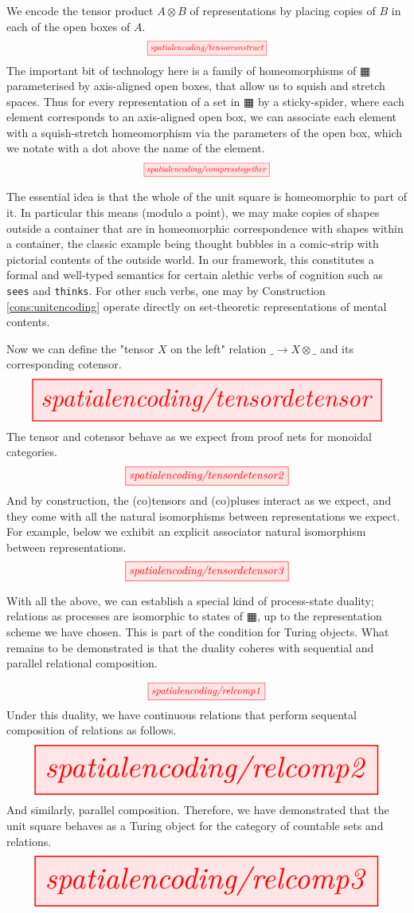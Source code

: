 We encode the tensor product $A \otimes B$ of representations by placing copies of $B$ in each of the open boxes of $A$.
\[\scalebox{0.75}{\tikzfig{spatialencoding/tensorconstruct}}\]
The important bit of technology here is a family of homeomorphisms of $\squarehvfill$ parameterised by axis-aligned open boxes, that allow us to squish and stretch spaces. Thus for every representation of a set in $\squarehvfill$ by a sticky-spider, where each element corresponds to an axis-aligned open box, we can associate each element with a squish-stretch homeomorphism via the parameters of the open box, which we notate with a dot above the name of the element.
\[\scalebox{0.75}{\tikzfig{spatialencoding/compresstogether}}\]
\begin{remark}
The essential idea is that the whole of the unit square is homeomorphic to part of it. In particular this means (modulo a point), we may make copies of shapes outside a container that are in homeomorphic correspondence with shapes within a container, the classic example being thought bubbles in a comic-strip with pictorial contents of the outside world. In our framework, this constitutes a formal and well-typed semantics for certain alethic verbs of cognition such as \texttt{sees} and \texttt{thinks}. For other such verbs, one may by Construction \ref{cons:unitencoding} operate directly on set-theoretic representations of mental contents.
\end{remark}

Now we can define the "tensor $X$ on the left" relation $\_ \rightarrow X \otimes \_$ and its corresponding cotensor.
\[\resizebox{\textwidth}{!}{\tikzfig{spatialencoding/tensordetensor}}\]
The tensor and cotensor behave as we expect from proof nets for monoidal categories.
\[\scalebox{1}{\tikzfig{spatialencoding/tensordetensor2}}\]
And by construction, the (co)tensors and (co)pluses interact as we expect, and they come with all the natural isomorphisms between representations we expect. For example, below we exhibit an explicit associator natural isomorphism between representations.
\[\scalebox{1}{\tikzfig{spatialencoding/tensordetensor3}}\]

\begin{construction}\label{cons:unitencoding}
With all the above, we can establish a special kind of process-state duality; relations as processes are isomorphic to states of $\squarehvfill$, up to the representation scheme we have chosen. This is part of the condition for Turing objects. What remains to be demonstrated is that the duality coheres with sequential and parallel relational composition.
\end{construction}
\[\scalebox{0.9}{\tikzfig{spatialencoding/relcomp1}}\]
Under this duality, we have continuous relations that perform sequental composition of relations as follows.
\[\resizebox{\textwidth}{!}{\tikzfig{spatialencoding/relcomp2}}\]
And similarly, parallel composition. Therefore, we have demonstrated that the unit square behaves as a Turing object for the category of countable sets and relations.
\[\resizebox{\textwidth}{!}{\tikzfig{spatialencoding/relcomp3}}\]